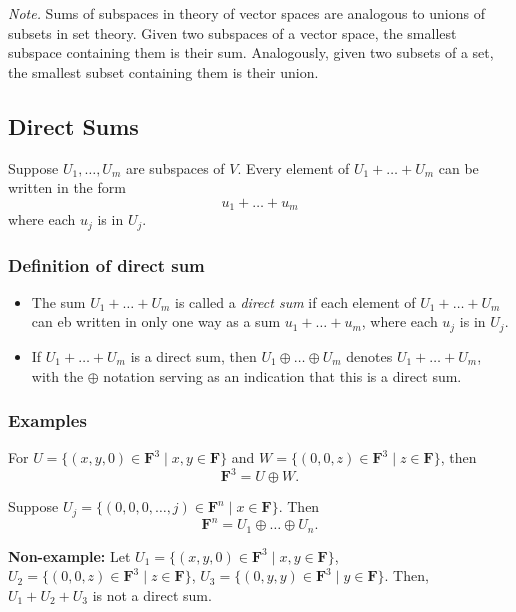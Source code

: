 \documentclass[11pt]{article}
\begin{document}
    \emph{Note.} Sums of subspaces in theory of vector spaces are analogous to unions of subsets in set theory. Given two subspaces of a vector space, the smallest subspace containing them is their sum. Analogously, given two subsets of a set, the smallest subset containing them is their union.

    \subsection{Direct Sums}

    Suppose \(U_1, \dots, U_m\) are subspaces of $V$. Every element of \(U_1 + \dots + U_m\) can be written in the form \[u_1 + \dots + u_m\] where each \(u_j\) is in $U_j$.

    \subsubsection{Definition of direct sum}

    \begin{itemize}
        \item The sum \(U_1 + \dots + U_m\) is called a \emph{direct sum} if each element of \(U_1 + \dots + U_m\) can eb written in only one way as a sum \(u_1 + \dots + u_m\), where each \(u_j\) is in \(U_j\).
        \item If \(U_1 + \dots + U_m\) is a direct sum, then \(U_1 \oplus \dots \oplus U_m\) denotes \(U_1 + \dots + U_m\), with the \(\oplus\) notation serving as an indication that this is a direct sum. 
    \end{itemize}

    \subsubsection{Examples}

    For \(U = \{(x,y,0) \in \textbf{F}^3 \mid x,y \in \textbf{F}\}\) and \(W = \{(0,0,z) \in \textbf{F}^3 \mid z \in \textbf{F}\}\), then \[\textbf{F}^3 = U \oplus W.\]

    Suppose \(U_j = \{(0,0,0,\dots, j) \in \textbf{F}^n \mid x \in \textbf{F}\}\). Then \[\textbf{F}^n = U_1 \oplus \dots \oplus U_n.\]

    \textbf{Non-example:} Let \(U_1 = \{(x,y,0) \in \textbf{F}^3 \mid x,y \in \textbf{F}\}\), \(U_2 = \{(0,0,z) \in \textbf{F}^3 \mid z \in \textbf{F}\}\), \(U_3 = \{(0,y,y) \in \textbf{F}^3 \mid y \in \textbf{F}\}\). Then, \(U_1 + U_2 + U_3\) is not a direct sum. 
\end{document}

